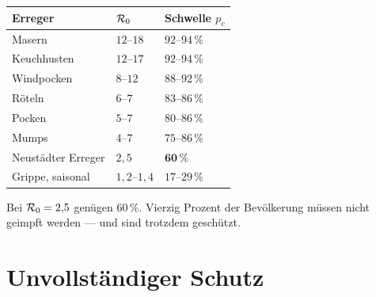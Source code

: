 \begin{merksatz}
\begin{center}
{\small
\renewcommand{\arraystretch}{1.48}
\begin{tabular}{@{}P{2.6cm}P{2.2cm}P{2.6cm}@{}}
\toprule
\textbf{Erreger} & $\mathcal{R}_0$ & \textbf{Schwelle $p_c$}\\
\midrule
Masern & $12$--$18$ & $92$--$94\,\%$\\
Keuchhusten & $12$--$17$ & $92$--$94\,\%$\\
Windpocken & $8$--$12$ & $88$--$92\,\%$\\
Röteln & $6$--$7$ & $83$--$86\,\%$\\
Pocken & $5$--$7$ & $80$--$86\,\%$\\
Mumps & $4$--$7$ & $75$--$86\,\%$\\
Neustädter Erreger & $2{,}5$ & $\mathbf{60\,\%}$\\
Grippe, saisonal & $1{,}2$--$1{,}4$ & $17$--$29\,\%$\\
\bottomrule
\end{tabular}}
\end{center}

\begin{center}
\begin{minipage}{0.88\textwidth}
\end{minipage}
\end{center}

Bei $\mathcal{R}_0 = 2{,}5$ genügen $60\,\%$. Vierzig Prozent der Bevölkerung müssen nicht geimpft werden --- und sind trotzdem geschützt.
\end{merksatz}

\section{Unvollständiger Schutz}

